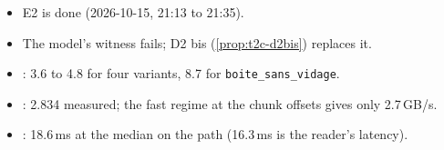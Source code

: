 \begin{itemize}
\item {} E2 is done (2026-10-15, 21:13 to 21:35).
\item {} The model's witness fails; D2 bis (\cref{prop:t2c-d2bis}) replaces it.
\item {}: 3.6 to 4.8 for four variants, 8.7 for \texttt{boite\_\allowbreak sans\_\allowbreak vidage}.
\item {}: 2.834 measured; the fast regime at the chunk offsets gives only 2.7\,GB/s.
\item {}: 18.6\,ms at the median on the path (16.3\,ms is the reader's latency).
\end{itemize}

